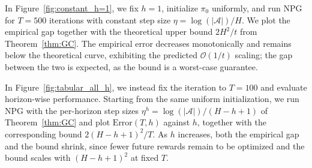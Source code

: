 \documentclass[11pt]{article}
\begin{document}
In Figure~\ref{fig:constant_h=1}, we fix $h=1$, initialize $\pi_0$ uniformly, and run NPG for $T=500$ iterations with constant step size $\eta=\log(|\mathcal A|)/H$. We plot the empirical gap together with the theoretical upper bound $2H^2/t$ from Theorem~\ref{thm:GC}. The empirical error decreases monotonically and remains below the theoretical curve, exhibiting the predicted $\mathcal{O}(1/t)$ scaling; the gap between the two is expected, as the bound is a worst-case guarantee. 


In Figure~\ref{fig:tabular_all_h}, we instead fix the iteration to $T=100$ and evaluate horizon-wise performance. Starting from the same uniform initialization, we run NPG with the per-horizon step sizes $\eta^h=\log(|\mathcal A|)/(H-h+1)$ of Theorem~\ref{thm:GC} and plot $\text{Error}(T,h)$ against $h$, together with the corresponding bound $2(H-h+1)^2/T$. As $h$ increases, both the empirical gap and the bound shrink, since fewer future rewards remain to be optimized and the bound scales with $(H-h+1)^2$ at fixed $T$.
\end{document}
